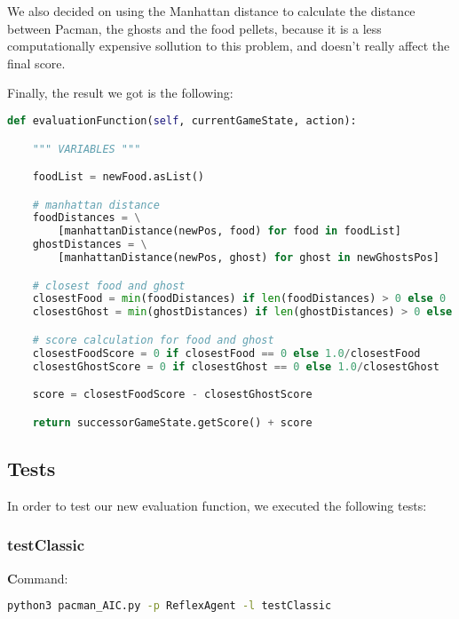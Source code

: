 \documentclass{article}
\begin{document}
\hbox{}

We also decided on using the Manhattan distance to calculate the distance between Pacman, the ghosts and the food pellets, because it is a less computationally expensive sollution to this problem, and doesn't really affect the final score.

\hbox{}

Finally, the result we got is the following:

\hbox{}

\begin{lstlisting}[language=python, frame=tlbr, framesep=6pt, backgroundcolor=\color{light-gray}]
def evaluationFunction(self, currentGameState, action):

    """ VARIABLES """

    foodList = newFood.asList()

    # manhattan distance
    foodDistances = \
        [manhattanDistance(newPos, food) for food in foodList]
    ghostDistances = \
        [manhattanDistance(newPos, ghost) for ghost in newGhostsPos]

    # closest food and ghost
    closestFood = min(foodDistances) if len(foodDistances) > 0 else 0
    closestGhost = min(ghostDistances) if len(ghostDistances) > 0 else 0

    # score calculation for food and ghost
    closestFoodScore = 0 if closestFood == 0 else 1.0/closestFood
    closestGhostScore = 0 if closestGhost == 0 else 1.0/closestGhost

    score = closestFoodScore - closestGhostScore

    return successorGameState.getScore() + score
\end{lstlisting}

\subsection{Tests}

In order to test our new evaluation function, we executed the following tests:

\subsubsection{testClassic}
\label{sec:testClassic}

\textbf Command:

\begin{lstlisting}[language=bash, frame=tlbr, framesep=6pt, backgroundcolor=\color{light-gray}]
    python3 pacman_AIC.py -p ReflexAgent -l testClassic
\end{lstlisting}
\end{document}
